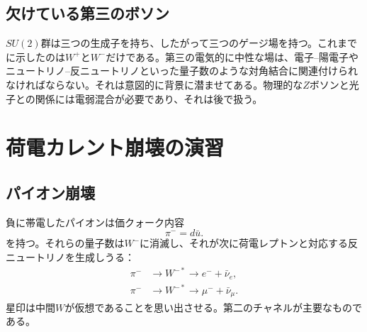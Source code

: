 \begin{classroomqa}
\end{classroomqa}

\subsection{欠けている第三のボソン}

\(SU(2)\)群は三つの生成子を持ち、したがって三つのゲージ場を持つ。これまでに示したのは\(W^+\)と\(W^-\)だけである。第三の電気的に中性な場は、電子--陽電子やニュートリノ--反ニュートリノといった量子数のような対角結合に関連付けられなければならない。それは意図的に背景に潜ませてある。物理的な\(Z\)ボソンと光子との関係には電弱混合が必要であり、それは後で扱う。

\begin{classroomqa}
\end{classroomqa}

\section{荷電カレント崩壊の演習}

\subsection{パイオン崩壊}

負に帯電したパイオンは価クォーク内容
\begin{equation}
\pi^-=d\bar u.
\end{equation}
を持つ。それらの量子数は\(W^-\)に消滅し、それが次に荷電レプトンと対応する反ニュートリノを生成しうる：
\begin{align}
\pi^-&\longrightarrow W^{-*}
\longrightarrow e^-+\bar\nu_e,
\label{eq:l5-pion-electron}\\
\pi^-&\longrightarrow W^{-*}
\longrightarrow \mu^-+\bar\nu_\mu.
\label{eq:l5-pion-muon}
\end{align}
星印は中間\(W\)が仮想であることを思い出させる。第二のチャネルが主要なものである。

